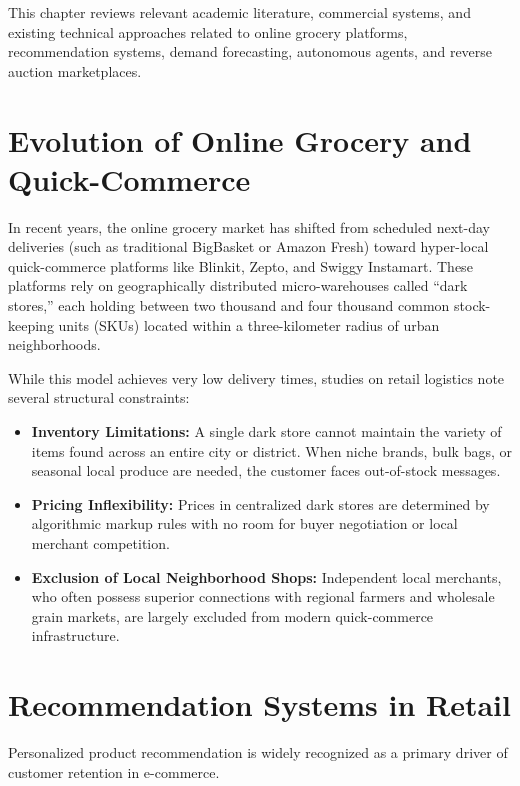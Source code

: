 
This chapter reviews relevant academic literature, commercial systems, and existing technical approaches related to online grocery platforms, recommendation systems, demand forecasting, autonomous agents, and reverse auction marketplaces.

\section{Evolution of Online Grocery and Quick-Commerce}

In recent years, the online grocery market has shifted from scheduled next-day deliveries (such as traditional BigBasket or Amazon Fresh) toward hyper-local quick-commerce platforms like Blinkit, Zepto, and Swiggy Instamart. These platforms rely on geographically distributed micro-warehouses called ``dark stores,'' each holding between two thousand and four thousand common stock-keeping units (SKUs) located within a three-kilometer radius of urban neighborhoods.

While this model achieves very low delivery times, studies on retail logistics note several structural constraints:
\begin{itemize}
    \item \textbf{Inventory Limitations:} A single dark store cannot maintain the variety of items found across an entire city or district. When niche brands, bulk bags, or seasonal local produce are needed, the customer faces out-of-stock messages.
    \item \textbf{Pricing Inflexibility:} Prices in centralized dark stores are determined by algorithmic markup rules with no room for buyer negotiation or local merchant competition.
    \item \textbf{Exclusion of Local Neighborhood Shops:} Independent local merchants, who often possess superior connections with regional farmers and wholesale grain markets, are largely excluded from modern quick-commerce infrastructure.
\end{itemize}

\section{Recommendation Systems in Retail}

Personalized product recommendation is widely recognized as a primary driver of customer retention in e-commerce.

